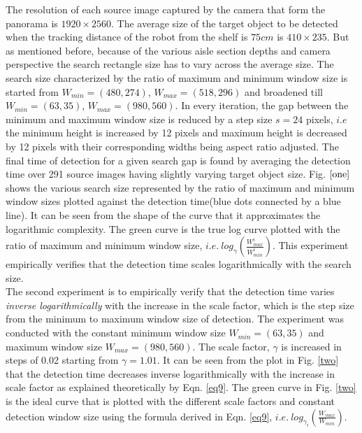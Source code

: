 The resolution of each source image captured by the camera that form the panorama is $1920 \times 2560$. The average size of the target object to be detected when the tracking distance of the robot from the shelf is $75cm$ is $410 \times 235$. But as mentioned before, because of the various aisle section depths and camera perspective the search rectangle size has to vary across the average size. The search size characterized by the ratio of maximum and minimum window size is started from $W_{min}=(480, 274)$, $W_{max}=(518, 296)$ and broadened till $W_{min}=(63, 35)$, $W_{max}=(980, 560)$. In every iteration, the gap between the minimum and maximum window size is reduced by a step size $s = 24$ pixels, $i.e$ the minimum height is increased by 12 pixels and maximum height is decreased by 12 pixels with their corresponding widths being aspect ratio adjusted. The final time of detection for a given search gap is found by averaging the detection time over 291 source images having slightly varying target object size. Fig. $\ref{one}$ shows the various search size represented by the ratio of maximum and minimum window sizes plotted against the detection time(blue dots connected by a blue line). It can be seen from the shape of the curve that it approximates the logarithmic complexity. The green curve is the true log curve plotted with the ratio of maximum and minimum window size, $i.e. \ log_\gamma(\frac{W_{max}^i}{W_{min}^i})$. This experiment empirically verifies that the detection time scales logarithmically with the search size. \\

The second experiment is to empirically verify that the detection time varies \textit{inverse logarithmically} with the increase in the scale factor, which is the step size from the minimum to maximum window size of detection. The experiment was conducted with the constant minimum window size $W_{min}=(63, 35)$ and maximum window size $W_{max}=(980, 560)$. The scale factor, $\gamma$ is increased in steps of 0.02 starting from $\gamma = 1.01$. It can be seen from the plot in Fig. \ref{two} that the detection time decreases inverse logarithmically with the increase in scale factor as explained theoretically by Eqn. \ref{eq9}. The green curve in Fig. \ref{two} is the ideal curve that is plotted with the different scale factors and constant detection window size using the formula derived in Eqn. \ref{eq9}, $i.e. \ log_{\gamma_i}(\frac{W_{max}}{W_{min}})$.


